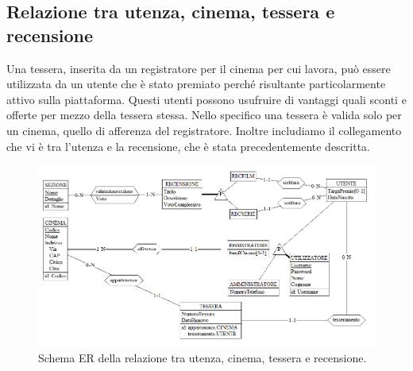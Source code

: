 \documentclass[a4paper,12pt]{report}
\begin{document}
	\subsection{Relazione tra utenza, cinema, tessera e recensione}
	Una tessera, inserita da un registratore per il cinema per cui lavora, può essere utilizzata da un utente che è stato premiato perché risultante particolarmente attivo sulla piattaforma. Questi utenti possono usufruire di vantaggi quali sconti e offerte per mezzo della tessera stessa. Nello specifico una tessera è valida solo per un cinema, quello di afferenza del registratore.
	Inoltre includiamo il collegamento che vi è tra l'utenza e la recensione, che è stata precedentemente descritta.
	\begin{figure}[H]
		\centering
		\includegraphics[width=450pt]{ER/utenzacinematesserarecensione.png}
		\caption{Schema ER della relazione tra utenza, cinema, tessera e recensione.}
	\end{figure}
\end{document}

